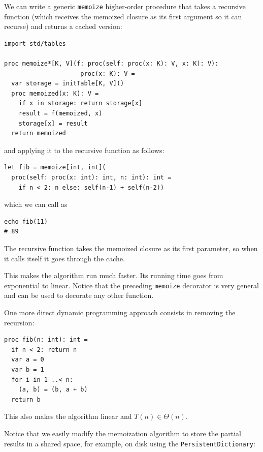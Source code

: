 \documentclass[justified, sixbynine]{tufte-book}
\def\ft{\small\tt}
\theoremstyle{plain}%
\newtheorem * {corollary}{Corollary}
\theoremstyle{definition}
\theoremstyle{remark}
\newtheorem * {remark}{Remark}
\newtheorem * {note}{Note}
\begin{document}
\begin{fullwidth}

We can write a generic {\ft memoize} higher-order procedure that takes a recursive function (which receives the memoized closure as its first argument so it can recurse) and returns a cached version:
\begin{lstlisting}[caption={in file: {\ft nlib/memoize.nim}}]
import std/tables

proc memoize*[K, V](f: proc(self: proc(x: K): V, x: K): V):
                     proc(x: K): V =
  var storage = initTable[K, V]()
  proc memoized(x: K): V =
    if x in storage: return storage[x]
    result = f(memoized, x)
    storage[x] = result
  return memoized
\end{lstlisting}

and applying it to the recursive function as follows:

\begin{lstlisting}
let fib = memoize[int, int](
  proc(self: proc(x: int): int, n: int): int =
    if n < 2: n else: self(n-1) + self(n-2))
\end{lstlisting}

which we can call as

\begin{lstlisting}
echo fib(11)
# 89
\end{lstlisting}

The recursive function takes the memoized closure as its first parameter, so when it calls itself it goes through the cache.

This makes the algorithm run much faster. Its running time goes from exponential to linear. Notice that the preceding {\ft memoize} decorator is very general and can be used to decorate any other function.

One more direct
dynamic programming approach consists in removing the recursion:

\begin{lstlisting}
proc fib(n: int): int =
  if n < 2: return n
  var a = 0
  var b = 1
  for i in 1 ..< n:
    (a, b) = (b, a + b)
  return b
\end{lstlisting}

This also makes the algorithm linear and $T(n) \in \Theta(n)$.


Notice that we easily modify the memoization algorithm to store the partial results in a shared space, for example, on disk using the {\ft PersistentDictionary}:


\end{fullwidth}
\end{document}
